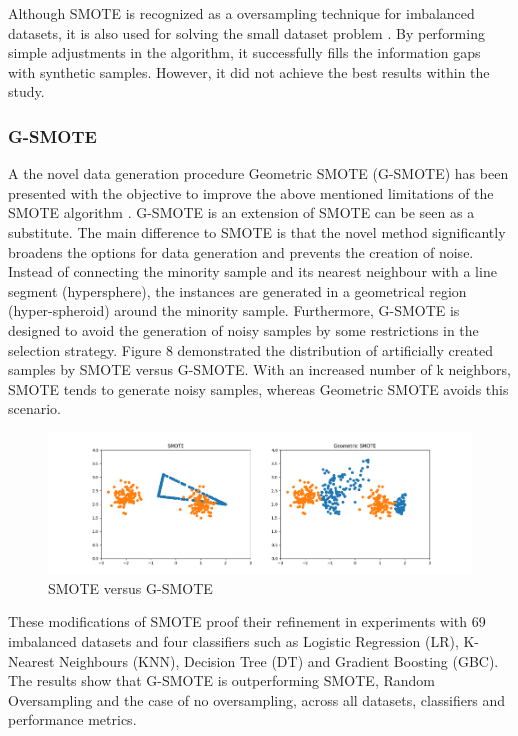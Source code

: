 \documentclass[parskip=full]{scrartcl}
\begin{document}
Although SMOTE is recognized as a oversampling technique for imbalanced
datasets, it is also used for solving the small dataset problem \cite{Li.2018}.
By performing simple adjustments in the algorithm, it successfully fills the
information gaps with synthetic samples. However, it did not achieve the best
results within the study.

\subsubsection{G-SMOTE}

A the novel data generation procedure Geometric SMOTE (G-SMOTE) has been 
presented with the objective to improve the above mentioned limitations of the 
SMOTE algorithm \cite{Douzas.2019b}. G-SMOTE is an extension of SMOTE can be 
seen as a substitute. The main difference to SMOTE is that the novel method 
significantly broadens the options for data generation and prevents the 
creation of noise. Instead of connecting the minority sample and its nearest 
neighbour with a line segment (hypersphere), the instances are generated in a 
geometrical region (hyper-spheroid) around the minority sample. Furthermore, 
G-SMOTE is designed to avoid the generation of noisy samples by some 
restrictions in the selection strategy. Figure 8 demonstrated the distribution 
of artificially created samples by SMOTE versus G-SMOTE. With an increased 
number of k neighbors, SMOTE tends to generate noisy samples, whereas Geometric 
SMOTE avoids this scenario.

\begin{figure}[H]
	\centering
	\includegraphics[width=0.8\linewidth]{./resources/smote_vs_gsmote}
	\caption{SMOTE versus G-SMOTE \cite{Douzas.2019}}
	\label{fig:smotevsgsmote}
\end{figure}

These modifications of SMOTE proof their refinement in experiments with 69 
imbalanced datasets and four classifiers such as Logistic Regression (LR), 
K-Nearest Neighbours (KNN), Decision Tree (DT) and Gradient Boosting (GBC). The 
results show that G-SMOTE is outperforming SMOTE, Random Oversampling and the 
case of no oversampling, across all datasets, classifiers and performance 
metrics.    
\end{document}
